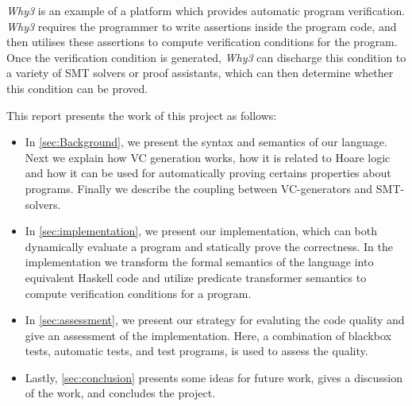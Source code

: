 

\textit{Why3} is an example of a platform which provides automatic program verification.
\textit{Why3} requires the programmer to write assertions inside the program code, and then utilises these assertions to compute verification conditions for the program.
Once the verification condition is generated, \textit{Why3} can discharge this condition to a variety of SMT solvers or proof assistants, which can then determine whether this condition can be proved.


This report presents the work of this project as follows:

\begin{itemize}
  \item In \cref{sec:Background}, we present the syntax and semantics of our language.
  Next we explain how VC generation works, how it is related to Hoare logic and how it can be used for automatically proving certains properties about programs. Finally we describe the coupling between VC-generators and SMT-solvers.
\item In \cref{sec:implementation}, we present our implementation, which can both dynamically evaluate a program and statically prove the correctness.
In the implementation we transform the formal semantics of the language into equivalent Haskell code and utilize predicate transformer semantics to compute verification conditions for a program.
\item In \cref{sec:assessment}, we present our strategy for evaluting the code quality and give an assessment of the implementation.
 Here, a combination of blackbox tests, automatic tests, and test programs, is used to assess the quality.
\item Lastly, \cref{sec:conclusion} presents some ideas for future work, gives a discussion of the work, and concludes the project.
\end{itemize}

